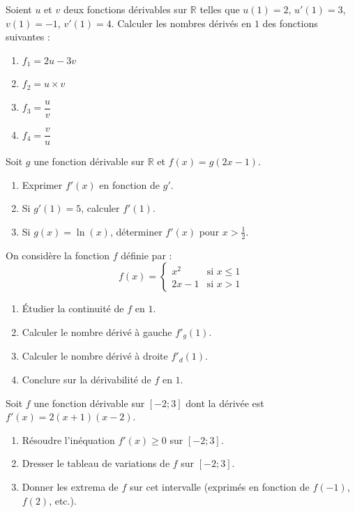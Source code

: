 \documentclass[11pt]{article}
\begin{document}
\begin{exercice}
Soient $u$ et $v$ deux fonctions dérivables sur $\mathbb{R}$ telles que $u(1)=2$, $u'(1)=3$, $v(1)=-1$, $v'(1)=4$.
Calculer les nombres dérivés en $1$ des fonctions suivantes :
\begin{enumerate}
    \item $f_1 = 2u - 3v$
    \item $f_2 = u \times v$
    \item $f_3 = \dfrac{u}{v}$
    \item $f_4 = \dfrac{v}{u}$
\end{enumerate}
\end{exercice}

\begin{exercice}
Soit $g$ une fonction dérivable sur $\mathbb{R}$ et $f(x) = g(2x-1)$.
\begin{enumerate}
    \item Exprimer $f'(x)$ en fonction de $g'$.
    \item Si $g'(1) = 5$, calculer $f'(1)$.
    \item Si $g(x) = \ln(x)$, déterminer $f'(x)$ pour $x > \frac{1}{2}$.
\end{enumerate}
\end{exercice}

\begin{exercice}
On considère la fonction $f$ définie par :
\[
f(x) = \begin{cases}
x^2 & \text{si } x \leq 1 \\
2x - 1 & \text{si } x > 1
\end{cases}
\]
\begin{enumerate}
    \item Étudier la continuité de $f$ en $1$.
    \item Calculer le nombre dérivé à gauche $f'_g(1)$.
    \item Calculer le nombre dérivé à droite $f'_d(1)$.
    \item Conclure sur la dérivabilité de $f$ en $1$.
\end{enumerate}
\end{exercice}

\begin{exercice}
Soit $f$ une fonction dérivable sur $[-2; 3]$ dont la dérivée est $f'(x) = 2(x+1)(x-2)$.
\begin{enumerate}
    \item Résoudre l'inéquation $f'(x) \geq 0$ sur $[-2; 3]$.
    \item Dresser le tableau de variations de $f$ sur $[-2; 3]$.
    \item Donner les extrema de $f$ sur cet intervalle (exprimés en fonction de $f(-1)$, $f(2)$, etc.).
\end{enumerate}
\end{exercice}
\end{document}
